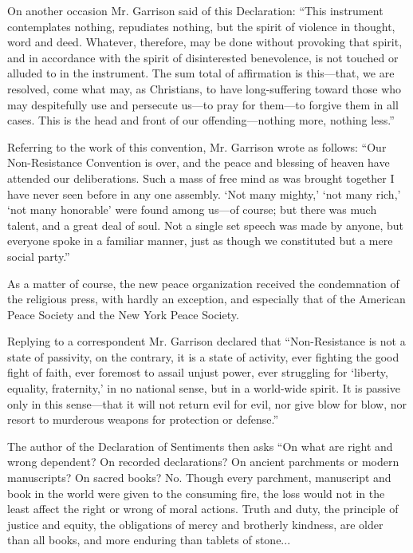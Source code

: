 \documentclass{book}
\begin{document}
On another occasion Mr. Garrison said of this Declaration: “This instrument contemplates nothing, repudiates nothing, but the spirit of violence in thought, word and deed. Whatever, therefore, may be done without provoking that spirit, and in accordance with the spirit of disinterested benevolence, is not touched or alluded to in the instrument. The sum total of affirmation is this—that, we are resolved, come what may, as Christians, to have long-suffering toward those who may despitefully use and persecute us—to pray for them—to forgive them in all cases. This is the head and front of our offending—nothing more, nothing less.”\footnotemark[3]

Referring to the work of this convention, Mr. Garrison wrote as follows: “Our Non-Resistance Convention is over, and the peace and blessing of heaven have attended our deliberations. Such a mass of free mind as was brought together I have never seen before in any one assembly. ‘Not many mighty,’ ‘not many rich,’ ‘not many honorable’ were found among us—of course; but there was much talent, and a great deal of soul. Not a single set speech was made by anyone, but everyone spoke in a familiar manner, just as though we constituted but a mere social party.”\footnotemark[4]

As a matter of course, the new peace organization received the condemnation of the religious press, with hardly an exception, and especially that of the American Peace Society and the New York Peace Society.

Replying to a correspondent Mr. Garrison declared that “Non-Resistance is not a state of passivity, on the contrary, it is a state of activity, ever fighting the good fight of faith, ever foremost to assail unjust power, ever struggling for ‘liberty, equality, fraternity,’ in no national sense, but in a world-wide spirit. It is passive only in this sense—that it will not return evil for evil, nor give blow for blow, nor resort to murderous weapons for protection or defense.”\footnotemark[5]

The author of the Declaration of Sentiments then asks “On what are right and wrong dependent? On recorded declarations? On ancient parchments or modern manuscripts? On sacred books? No. Though every parchment, manuscript and book in the world were given to the consuming fire, the loss would not in the least affect the right or wrong of moral actions. Truth and duty, the principle of justice and equity, the obligations of mercy and brotherly kindness, are older than all books, and more enduring than tablets of stone...
\end{document}
